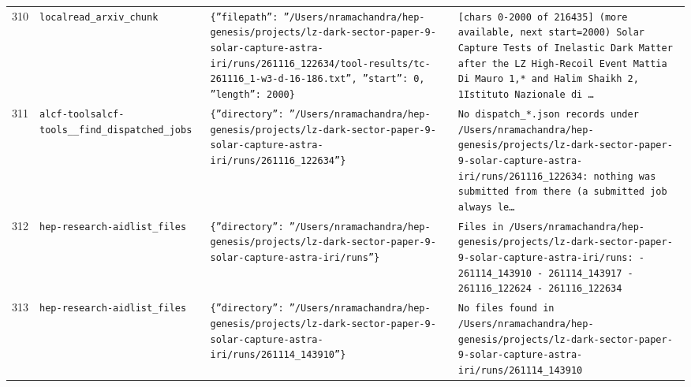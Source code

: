 \documentclass[11pt,a4paper]{article}
\begin{document}
\begin{longtable}{@{}p{}p{}p{}p{}@{}}
310 & \texttt{local}\newline\texttt{read\_\allowbreak{}arxiv\_\allowbreak{}chunk} & \texttt{\{''filepath'':\allowbreak{} ''/\allowbreak{}Users/\allowbreak{}nramachandra/\allowbreak{}hep-genesis/\allowbreak{}projects/\allowbreak{}lz-dark-sector-paper-9-solar-capture-astra-iri/\allowbreak{}runs/\allowbreak{}261116\_\allowbreak{}122634/\allowbreak{}tool-results/\allowbreak{}tc-261116\_\allowbreak{}1-w3-d-16-186.txt'',\allowbreak{} ''start'':\allowbreak{} 0,\allowbreak{} ''length'':\allowbreak{} 2000\}\allowbreak{}} & \texttt{[chars 0-2000 of 216435]\allowbreak{} (more available,\allowbreak{} next start=\allowbreak{}2000)\allowbreak{}  Solar Capture Tests of Inelastic Dark Matter after the LZ High-Recoil Event Mattia Di Mauro 1,\allowbreak{}* and Halim Shaikh 2,\allowbreak{}\dag{}\allowbreak{} 1Istituto Nazionale di \ldots{}\allowbreak{}} \\
311 & \texttt{alcf-tools}\newline\texttt{alcf-tools\_\allowbreak{}\_\allowbreak{}find\_\allowbreak{}dispatched\_\allowbreak{}jobs} & \texttt{\{''directory'':\allowbreak{} ''/\allowbreak{}Users/\allowbreak{}nramachandra/\allowbreak{}hep-genesis/\allowbreak{}projects/\allowbreak{}lz-dark-sector-paper-9-solar-capture-astra-iri/\allowbreak{}runs/\allowbreak{}261116\_\allowbreak{}122634''\}\allowbreak{}} & \texttt{No dispatch\_\allowbreak{}*.json records under /\allowbreak{}Users/\allowbreak{}nramachandra/\allowbreak{}hep-genesis/\allowbreak{}projects/\allowbreak{}lz-dark-sector-paper-9-solar-capture-astra-iri/\allowbreak{}runs/\allowbreak{}261116\_\allowbreak{}122634:\allowbreak{} nothing was submitted from there (a submitted job always le\ldots{}\allowbreak{}} \\
312 & \texttt{hep-research-aid}\newline\texttt{list\_\allowbreak{}files} & \texttt{\{''directory'':\allowbreak{} ''/\allowbreak{}Users/\allowbreak{}nramachandra/\allowbreak{}hep-genesis/\allowbreak{}projects/\allowbreak{}lz-dark-sector-paper-9-solar-capture-astra-iri/\allowbreak{}runs''\}\allowbreak{}} & \texttt{Files in /\allowbreak{}Users/\allowbreak{}nramachandra/\allowbreak{}hep-genesis/\allowbreak{}projects/\allowbreak{}lz-dark-sector-paper-9-solar-capture-astra-iri/\allowbreak{}runs:\allowbreak{}   - 261114\_\allowbreak{}143910   - 261114\_\allowbreak{}143917   - 261116\_\allowbreak{}122624   - 261116\_\allowbreak{}122634} \\
313 & \texttt{hep-research-aid}\newline\texttt{list\_\allowbreak{}files} & \texttt{\{''directory'':\allowbreak{} ''/\allowbreak{}Users/\allowbreak{}nramachandra/\allowbreak{}hep-genesis/\allowbreak{}projects/\allowbreak{}lz-dark-sector-paper-9-solar-capture-astra-iri/\allowbreak{}runs/\allowbreak{}261114\_\allowbreak{}143910''\}\allowbreak{}} & \texttt{No files found in /\allowbreak{}Users/\allowbreak{}nramachandra/\allowbreak{}hep-genesis/\allowbreak{}projects/\allowbreak{}lz-dark-sector-paper-9-solar-capture-astra-iri/\allowbreak{}runs/\allowbreak{}261114\_\allowbreak{}143910} \\

\end{longtable}
\end{document}
